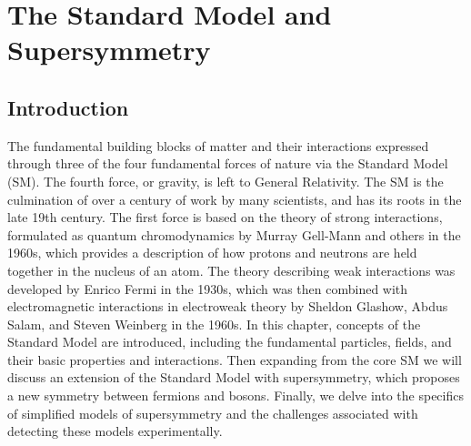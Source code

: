 



\setcounter{secnumdepth}{3}
\setcounter{tocdepth}{3}
\setlength{\parskip}{\smallskipamount}
\setlength{\parindent}{0pt}


\makeatletter


\providecommand{\tabularnewline}{\\}


\makeatother

%

\chapter{The Standard Model and Supersymmetry}



\section{Introduction}

The fundamental building blocks of matter and their interactions expressed through three of the four fundamental forces of nature via the Standard Model (SM). The fourth force, or gravity, is left to General Relativity. The SM  is the culmination of over a century of work by many scientists, and has its roots in the late 19th century. The first force is based on the theory of strong interactions, formulated as quantum chromodynamics by Murray Gell-Mann and others in the 1960s, which provides a description of how protons and neutrons are held together in the nucleus of an atom. The theory describing weak interactions was developed by Enrico Fermi in the 1930s, which was then combined with electromagnetic interactions in electroweak theory by Sheldon Glashow, Abdus Salam, and Steven Weinberg in the 1960s.
In this chapter, concepts of the Standard Model are introduced, including the fundamental particles, fields, and their basic properties and interactions. Then expanding from the core SM we will discuss an extension of the Standard Model with supersymmetry, which proposes a new symmetry between fermions and bosons. Finally, we delve into the specifics of simplified models of supersymmetry and the challenges associated with detecting these models experimentally.



